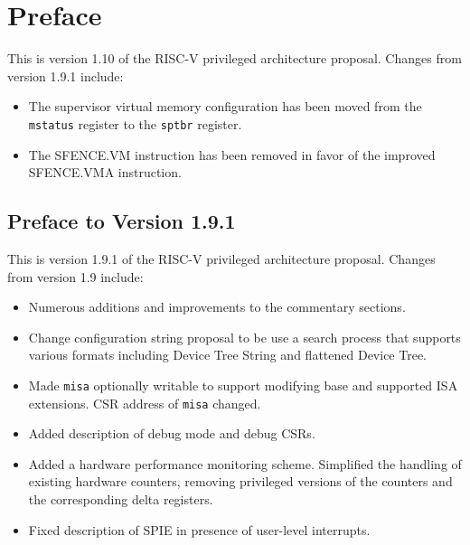 \chapter{Preface}

This is version 1.10 of the RISC-V privileged architecture
proposal.  Changes from version 1.9.1 include:

\begin{itemize}
  \parskip 0pt
  \itemsep 1pt
\item The supervisor virtual memory configuration has been moved from the
      {\tt mstatus} register to the {\tt sptbr} register.
\item The SFENCE.VM instruction has been removed in favor of the improved
      SFENCE.VMA instruction.
\end{itemize}

\section*{Preface to Version 1.9.1}

This is version 1.9.1 of the RISC-V privileged architecture
proposal.  Changes from version 1.9 include:

\begin{itemize}
  \parskip 0pt
  \itemsep 1pt
\item Numerous additions and improvements to the commentary sections.
\item Change configuration string proposal to be use a search process
  that supports various formats including Device Tree String and
  flattened Device Tree.
\item Made {\tt misa} optionally writable to support modifying base
  and supported ISA extensions.  CSR address of {\tt misa} changed.
\item Added description of debug mode and debug CSRs.
\item Added a hardware performance monitoring scheme.  Simplified the
  handling of existing hardware counters, removing privileged versions
  of the counters and the corresponding delta registers.
\item Fixed description of SPIE in presence of user-level interrupts.
\end{itemize}
